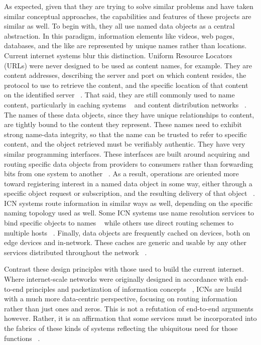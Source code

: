 As expected, given that they are trying to solve similar problems and have taken similar conceptual approaches, the capabilities and features of these projects are similar as well.  To begin with, they all use named data objects as a central abstraction.  In this paradigm, information elements like videos, web pages, databases, and the like are represented by unique names rather than locations.  Current internet systems blur this distinction.  Uniform Resource Locators (URLs) were never designed to be used as content names, for example.  They are content addresses, describing the server and port on which content resides, the protocol to use to retrieve the content, and the specific location of that content on the identified server ~\cite{rfc3986}.  That said, they are still commonly used to name content, particularly in caching systems ~\cite{rfc2616} and content distribution networks ~\cite{Nygren:2010:ANP:1842733.1842736}.  The names of these data objects, since they have unique relationships to content, are tightly bound to the content they represent.  These names need to exhibit strong name-data integrity, so that the name can be trusted to refer to specific content, and the object retrieved must be verifiably authentic.  They have very similar programming interfaces.  These interfaces are built around acquiring and routing specific data objects from providers to consumers rather than forwarding bits from one system to another ~\cite{rfc791,rfc793}.  As a result, operations are oriented more toward registering interest in a named data object in some way, either through a specific object request or subscription, and the resulting delivery of that object ~\cite{6231276}.  ICN systems route information in similar ways as well, depending on the specific naming topology used as well.  Some ICN systems use name resolution services to bind specific objects to names ~\cite{4698847} while others use direct routing schemes to multiple hosts ~\cite{Ghodsi:2011:NCA:2018584.2018586}.  Finally, data objects are frequently cached on devices, both on edge devices and in-network.  These caches are generic and usable by any other services distributed throughout the network ~\cite{6231276}.

Contrast these design principles with those used to build the current internet.  Where internet-scale networks were originally designed in accordance with end-to-end principles and packetization of information concepts ~\cite{Clark:1995:DPD:205447.205458,SaReCl:84}, ICNs are build with a much more data-centric perspective, focusing on routing information rather than just ones and zeros.  This is not a refutation of end-to-end arguments however.  Rather, it is an affirmation that some services must be incorporated into the fabrics of these kinds of systems reflecting the ubiquitous need for those functions ~\cite{Blumenthal:2001:RDI:383034.383037}.

